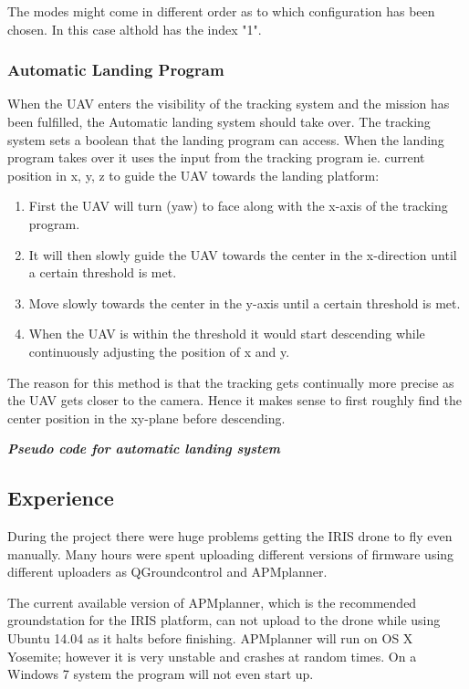 The modes might come in different order as to which configuration has been chosen. In this case althold has the index "1".
\subsubsection{Automatic Landing Program}

When the UAV enters the visibility of the tracking system and the mission has been fulfilled, the Automatic landing system should take over.
The tracking system sets a boolean that the landing program can access. When the landing program takes over it uses the input from the tracking program ie. current position in x, y, z to guide the UAV towards the landing platform:

\begin{enumerate}
\item First the UAV will turn (yaw) to face along with the x-axis of the tracking program.
\item It will then slowly guide the UAV towards the center in the x-direction until a certain threshold is met.
\item Move slowly towards the center in the y-axis until a certain threshold is met.
\item When the UAV is within the threshold it would start descending while continuously adjusting the position of x and y.
\end{enumerate}
The reason for this method is that the tracking gets continually more precise as the UAV gets closer to the camera. Hence it makes sense to first roughly find the center position in the xy-plane before descending. 

\emph{\textbf{Pseudo code for automatic landing system}}
\lstset{tabsize=4}


\subsection{Experience}
During the project there were huge problems getting the IRIS drone to fly even manually. Many hours were spent uploading different versions of firmware using different uploaders as QGroundcontrol and APMplanner. 

The current available version of APMplanner, which is the recommended groundstation for the IRIS platform, can not upload to the drone while using Ubuntu 14.04 as it halts before finishing. APMplanner will run on OS X Yosemite; however it is very unstable and crashes at random times. On a Windows 7 system the program will not even start up.

